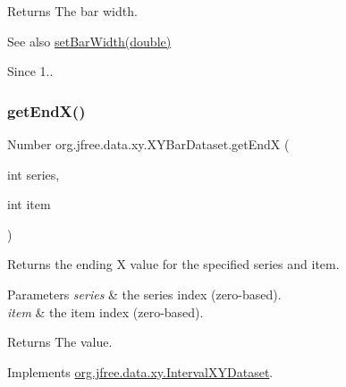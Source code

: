\begin{DoxyReturn}{Returns}
The bar width.
\end{DoxyReturn}
\begin{DoxySeeAlso}{See also}
\mbox{\hyperlink{classorg_1_1jfree_1_1data_1_1xy_1_1_x_y_bar_dataset_a866a70de4ee5b64b0a5da23ae4a140fa}{set\+Bar\+Width(double)}} 
\end{DoxySeeAlso}
\begin{DoxySince}{Since}
1.. 
\end{DoxySince}
\mbox{\label{classorg_1_1jfree_1_1data_1_1xy_1_1_x_y_bar_dataset_a8cbbb2473a1aa92d02cbb097d18e3f9e}} 
\subsubsection{\texorpdfstring{get\+End\+X()}{getEndX()}}
{\footnotesize\ttfamily Number org.\+jfree.\+data.\+xy.\+X\+Y\+Bar\+Dataset.\+get\+EndX (\begin{DoxyParamCaption}\item[{int}]{series,  }\item[{int}]{item }\end{DoxyParamCaption})}

Returns the ending X value for the specified series and item.


\begin{DoxyParams}{Parameters}
{\em series} & the series index (zero-\/based). \\
\hline
{\em item} & the item index (zero-\/based).\\
\hline
\end{DoxyParams}
\begin{DoxyReturn}{Returns}
The value. 
\end{DoxyReturn}


Implements \mbox{\hyperlink{interfaceorg_1_1jfree_1_1data_1_1xy_1_1_interval_x_y_dataset_a93161a6d6c1db37cfac030239c62ab0a}{org.\+jfree.\+data.\+xy.\+Interval\+X\+Y\+Dataset}}.

\mbox{\label{classorg_1_1jfree_1_1data_1_1xy_1_1_x_y_bar_dataset_af131ec7a0e1416df72f14cee94fe8cd0}} 
